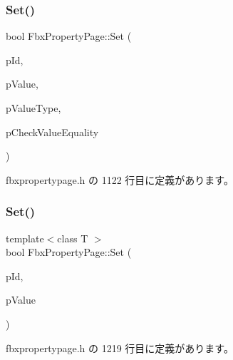 \subsubsection{\texorpdfstring{Set()}{Set()}\hspace{0.1cm}{\footnotesize\ttfamily [1/2]}}
{\footnotesize\ttfamily bool Fbx\+Property\+Page\+::\+Set (\begin{DoxyParamCaption}\item[{\hyperlink{fbxtypes_8h_a088fa96de3b0b3ea69f0f6afef525dfb}{Fbx\+Int}}]{p\+Id,  }\item[{const void $\ast$}]{p\+Value,  }\item[{\hyperlink{fbxpropertytypes_8h_a73913a5ddfb20e57c6f25e9e6784bd92}{E\+Fbx\+Type}}]{p\+Value\+Type,  }\item[{bool}]{p\+Check\+Value\+Equality }\end{DoxyParamCaption})\hspace{0.3cm}{\ttfamily [inline]}}



 fbxpropertypage.\+h の 1122 行目に定義があります。

\mbox{\label{class_fbx_property_page_a33ab1efe617ddf50b88ed19cb77161a5}} 
\subsubsection{\texorpdfstring{Set()}{Set()}\hspace{0.1cm}{\footnotesize\ttfamily [2/2]}}
{\footnotesize\ttfamily template$<$class T $>$ \\
bool Fbx\+Property\+Page\+::\+Set (\begin{DoxyParamCaption}\item[{\hyperlink{fbxtypes_8h_a088fa96de3b0b3ea69f0f6afef525dfb}{Fbx\+Int}}]{p\+Id,  }\item[{const T \&}]{p\+Value }\end{DoxyParamCaption})\hspace{0.3cm}{\ttfamily [inline]}}



 fbxpropertypage.\+h の 1219 行目に定義があります。

\mbox{\label{class_fbx_property_page_a99e3d4bbf13e51e4f1448e1d18043b54}} 
